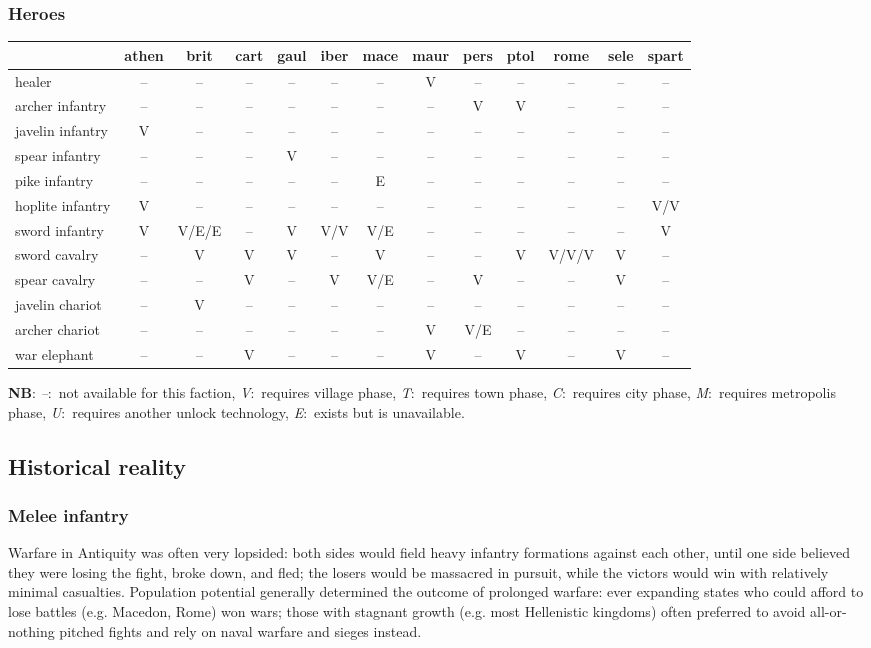 \documentclass{article}
\newcommand{\legenda}{
\textbf{NB}:
\emph{--}:~not available for this faction, 
\emph{V}:~requires village phase, 
\emph{T}:~requires town phase, 
\emph{C}:~requires city phase, 
\emph{M}:~requires metropolis phase, 
\emph{U}:~requires another unlock technology, 
\emph{E}:~exists but is unavailable.
}
\begin{document}
\subsubsection{Heroes}
\begin{tabular}{l|cccc|cccc|cccc}
 & athen & brit & cart & gaul & iber & mace & maur & pers & ptol & rome & sele & spart \\
\hline
healer           & -- & -- & -- & -- & -- & -- & V  & -- & -- & -- & -- & -- \\
archer infantry  & -- & -- & -- & -- & -- & -- & -- & V  & V  & -- & -- & -- \\
javelin infantry & V  & -- & -- & -- & -- & -- & -- & -- & -- & -- & -- & -- \\
spear infantry   & -- & -- & -- & V  & -- & -- & -- & -- & -- & -- & -- & -- \\
pike infantry    & -- & -- & -- & -- & -- & E  & -- & -- & -- & -- & -- & -- \\
hoplite infantry & V  & -- & -- & -- & -- & -- & -- & -- & -- & -- & -- & V/V\\
sword infantry   & V &V/E/E& -- & V  & V/V& V/E& -- & -- & -- & -- & -- & V  \\
sword cavalry    & -- & V  & V  & V  & -- & V  & -- & -- & V &V/V/V& V  & -- \\
spear cavalry    & -- & -- & V  & -- & V  & V/E& -- & V  & -- & -- & V  & -- \\
javelin chariot  & -- & V  & -- & -- & -- & -- & -- & -- & -- & -- & -- & -- \\
archer chariot   & -- & -- & -- & -- & -- & -- & V  & V/E& -- & -- & -- & -- \\
war elephant     & -- & -- & V  & -- & -- & -- & V  & -- & V  & -- & V  & -- \\
\end{tabular}

\legenda


\clearpage
\subsection{Historical reality}
\subsubsection{Melee infantry}
Warfare in Antiquity was often very lopsided: both sides would field heavy infantry formations against each other, until one side believed they were losing the fight, broke down, and fled; the losers would be massacred in pursuit, while the victors would win with relatively minimal casualties. Population potential generally determined the outcome of prolonged warfare: ever expanding states who could afford to lose battles (e.g. Macedon, Rome) won wars; those with stagnant growth (e.g. most Hellenistic kingdoms) often preferred to avoid all-or-nothing pitched fights and rely on naval warfare and sieges instead.
\\
\end{document}
